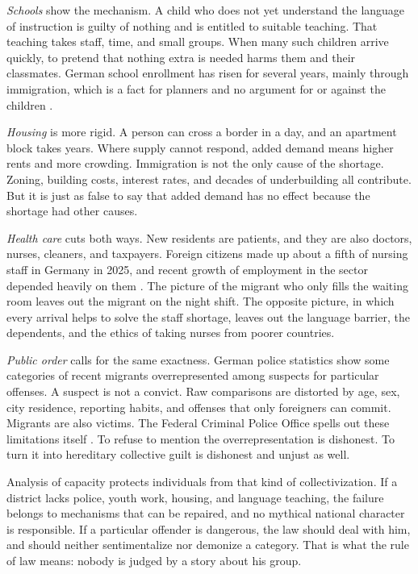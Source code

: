 \documentclass[12pt,a4paper]{book}
\begin{document}
\emph{Schools} show the mechanism. A child who does not yet understand the language of instruction is guilty of nothing and is entitled to suitable teaching. That teaching takes staff, time, and small groups. When many such children arrive quickly, to pretend that nothing extra is needed harms them and their classmates. German school enrollment has risen for several years, mainly through immigration, which is a fact for planners and no argument for or against the children \cite{DestatisSchools2025}.

\emph{Housing} is more rigid. A person can cross a border in a day, and an apartment block takes years. Where supply cannot respond, added demand means higher rents and more crowding. Immigration is not the only cause of the shortage. Zoning, building costs, interest rates, and decades of underbuilding all contribute. But it is just as false to say that added demand has no effect because the shortage had other causes.

\emph{Health care} cuts both ways. New residents are patients, and they are also doctors, nurses, cleaners, and taxpayers. Foreign citizens made up about a fifth of nursing staff in Germany in 2025, and recent growth of employment in the sector depended heavily on them \cite{BundesagenturPflege2026}. The picture of the migrant who only fills the waiting room leaves out the migrant on the night shift. The opposite picture, in which every arrival helps to solve the staff shortage, leaves out the language barrier, the dependents, and the ethics of taking nurses from poorer countries.

\emph{Public order} calls for the same exactness. German police statistics show some categories of recent migrants overrepresented among suspects for particular offenses. A suspect is not a convict. Raw comparisons are distorted by age, sex, city residence, reporting habits, and offenses that only foreigners can commit. Migrants are also victims. The Federal Criminal Police Office spells out these limitations itself \cite{BKAFluchtmigration2023}. To refuse to mention the overrepresentation is dishonest. To turn it into hereditary collective guilt is dishonest and unjust as well.

Analysis of capacity protects individuals from that kind of collectivization. If a district lacks police, youth work, housing, and language teaching, the failure belongs to mechanisms that can be repaired, and no mythical national character is responsible. If a particular offender is dangerous, the law should deal with him, and should neither sentimentalize nor demonize a category. That is what the rule of law means: nobody is judged by a story about his group.
\end{document}
